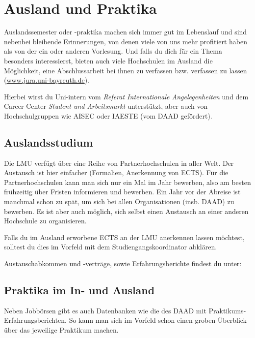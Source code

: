 ﻿\chapter{Ausland und Praktika}

Auslandssemester oder -praktika machen sich immer gut im Lebenslauf
und sind nebenbei bleibende Erinnerungen, von denen viele von uns mehr
profitiert haben als von der ein oder anderen Vorlesung. Und falls du
dich für ein Thema besonders interessierst, bieten auch viele
Hochschulen im Ausland die Möglichkeit, eine Abschlussarbeit bei ihnen
zu verfassen bzw. verfassen zu lassen (\url{www.jura.uni-bayreuth.de}).

Hierbei wirst du Uni-intern vom \emph{Referat Internationale Angelegenheiten} und dem Career Center \emph{Student und Arbeitsmarkt} unterstützt, aber auch von Hochschulgruppen wie AISEC oder IAESTE (vom DAAD gefördert).

\section{Auslandsstudium}

Die LMU verfügt über eine Reihe von Partnerhochschulen in aller
Welt. Der Austausch ist hier einfacher (Formalien, Anerkennung von
ECTS). Für die
Partnerhochschulen kann man sich nur ein Mal im Jahr bewerben, also am
besten frühzeitig über Fristen informieren und bewerben.
Ein Jahr vor der Abreise ist manchmal schon zu spät, um sich bei
allen Organisationen (insb. DAAD) zu bewerben.
Es ist aber auch möglich, sich selbst einen Austausch an einer anderen
Hochschule zu organisieren.

Falls du im Ausland erworbene ECTS an der LMU anerkennen lassen
möchtest, solltest du dies im Vorfeld mit dem Studiengangskoordinator
abklären.

Austauschabkommen und -verträge, sowie Erfahrungsberichte findest du unter:\\
\begin{urlList}
\end{urlList}

\section{Praktika im In- und Ausland}

Neben Jobbörsen gibt es auch Datenbanken wie die des DAAD mit
Praktikums-Erfahrungsberichten. So kann man sich im Vorfeld schon
einen groben Überblick über das jeweilige Praktikum machen.
\begin{urlList}
\end{urlList}


